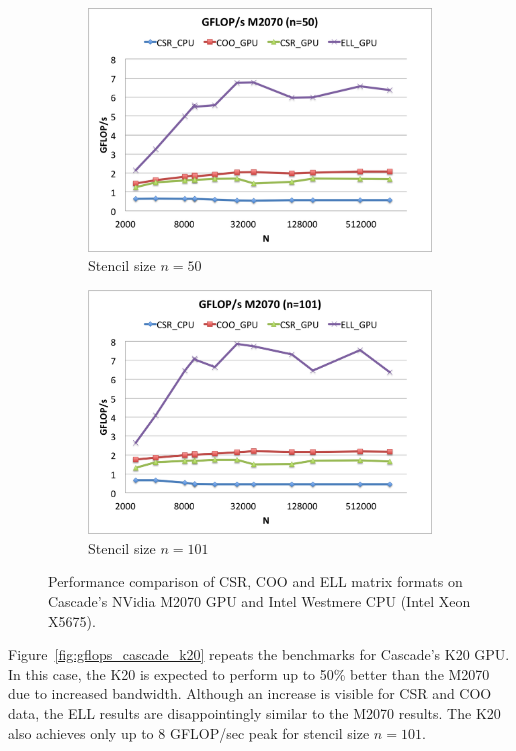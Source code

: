 \documentclass{report}
\begin{document}
\begin{figure}
\begin{subfigure}[t]{0.48\textwidth}
\includegraphics[width=\textwidth]{gpu_content/cascade_spmv/gflops_cascade_m2070_n50.png}
\caption{Stencil size $n=50$}
\end{subfigure}
\quad
\begin{subfigure}[t]{0.48\textwidth}
\centering
\includegraphics[width=\textwidth]{gpu_content/cascade_spmv/gflops_cascade_m2070_n101.png}
\caption{Stencil size $n=101$}
\end{subfigure}
\caption{Performance comparison of CSR, COO and ELL matrix formats on Cascade's NVidia M2070 GPU and Intel Westmere CPU (Intel Xeon X5675).}
\label{fig:gflops_cascade_m2070}
\end{figure}

Figure~\ref{fig:gflops_cascade_k20} repeats the benchmarks for Cascade's K20 GPU. In this case, the K20 is expected to perform up to 50\% better than the M2070 due to increased bandwidth. Although an increase is visible for CSR and COO data, the ELL results are disappointingly similar to the M2070 results. The K20 also achieves only up to 8 GFLOP/sec peak for stencil size $n=101$. 
\end{document}
